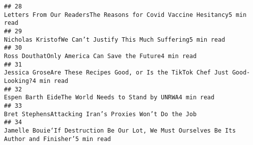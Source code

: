 \documentclass[
]{article}
\begin{document}
\begin{verbatim}
## 28                                                                                                                                                                                                                                                                                                                                             Letters From Our ReadersThe Reasons for Covid Vaccine Hesitancy5 min read
## 29                                                                                                                                                                                                                                                                                                                                                        Nicholas KristofWe Can’t Justify This Much Suffering5 min read
## 30                                                                                                                                                                                                                                                                                                                                                                Ross DouthatOnly America Can Save the Future4 min read
## 31                                                                                                                                                                                                                                                                                                                               Jessica GroseAre These Recipes Good, or Is the TikTok Chef Just Good-Looking?4 min read
## 32                                                                                                                                                                                                                                                                                                                                                           Espen Barth EideThe World Needs to Stand by UNRWA4 min read
## 33                                                                                                                                                                                                                                                                                                                                                                Bret StephensAttacking Iran’s Proxies Won’t Do the Job
## 34                                                                                                                                                                                                                                                                                                                      Jamelle Bouie‘If Destruction Be Our Lot, We Must Ourselves Be Its Author and Finisher’5 min read

\end{verbatim}
\end{document}
